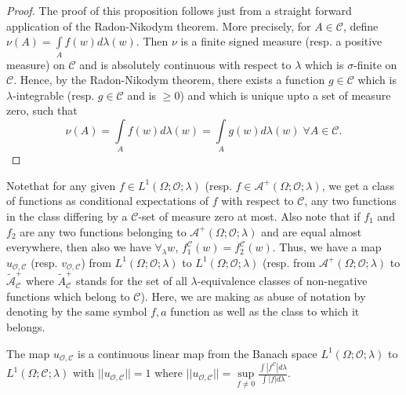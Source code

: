 \begin{proof}
The proof of this proposition follows just from a straight forward
application of the Radon-Nikodym theorem. More precisely, for $A \in
\mathscr{C}$, define $\nu(A) = \int\limits_A f(w) d\lambda(w)$. Then
$\nu$ is a finite signed measure (resp. a positive measure) on
$\mathscr{C}$ and is absolutely continuous with respect to $\lambda$
which is $\sigma$-finite on $\mathscr{C}$. Hence, by the Radon-Nikodym
theorem, there exists a function $g \in \mathscr{C}$ which is
$\lambda$-integrable (resp. $g \in \mathscr{C}$ and is $ \geq 0$) and
which is unique upto a set of measure zero, such that 
$$
\nu(A) = \int\limits_A f(w) d \lambda (w) = \int\limits_A g (w) d
\lambda(w) \; \forall  A \in \mathscr{C}. 
$$
\end{proof}

Note\pageoriginale that for any given $f \in L^1(\Omega; \mathscr{O};
\lambda)$ (resp. $f \in \mathscr{A}^+ (\Omega; \mathscr{O}; \lambda)$,
we get a class of functions as conditional expectations of $f$ with
respect to $\mathscr{C}$, any two functions in the class differing by
a $\mathscr{C}$-set of measure zero at most. Also note that if $f_1$
and $f_2$ are any two functions belonging to $\mathscr{A}^+ (\Omega ;
\mathscr{O}; \lambda)$ and are equal almost everywhere, then also we
have $\forall_\lambda w$, $f^\mathscr{C}_1(w) = f^\mathscr{C}_2
(w)$. Thus, we have a map $u_{\mathscr{O}, \mathscr{C}}$
(resp. $v_{\mathscr{O}, \mathscr{C}}$) from $L^1 (\Omega; \mathscr{O};
\lambda)$ to $L^1 (\Omega; \mathscr{O}; \lambda)$ (resp. from
$\mathscr{A}^+ (\Omega; \mathscr{O}; \lambda)$ to
$\tilde{\mathscr{A}}^+_\mathscr{C}$ where $\tilde{A}^+_\mathscr{C}$
stands for the set of all $\lambda$-equivalence classes of
non-negative functions which belong to $\mathscr{C}$). Here, we are
making as abuse of notation by denoting by the same symbol $f, a$
function as well as the class to which it belongs.

The map $u_{\mathscr{O}, \mathscr{C}}$ is a continuous linear map from
the Banach space $L^1(\Omega; \mathscr{O}; \lambda)$ to $L^1 (\Omega;
\mathscr{C}; \lambda)$ with $||u_{\mathscr{O}, \mathscr{C}}|| = 1$
where $||u_{\mathscr{O}, \mathscr{C}}|| = \sup\limits_{f \neq 0}
\frac{\int |f^\mathscr{C}| d\lambda}{\int|f|d \lambda}$. 

